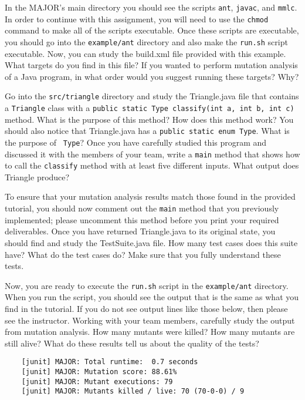 In the MAJOR's main directory you should see the scripts {\tt ant}, {\tt javac}, and {\tt mmlc}.  In order to continue
with this assignment, you will need to use the {\tt chmod} command to make all of the scripts executable.  Once these
scripts are executable, you should go into the {\tt example/ant} directory and also make the {\tt run.sh} script
executable.  Now, you can study the build.xml file provided with this example. What targets do you find in this file? If
you wanted to perform mutation analysis of a Java program, in what order would you suggest running these targets? Why?

Go into the {\tt src/triangle} directory and study the Triangle.java file that contains a {\tt Triangle} class with a
{\tt public static Type classify(int a, int b, int c)} method.  What is the purpose of this method? How does this method
work?  You should also notice that Triangle.java has a {\tt public static enum Type}.  What is the purpose of {\tt
Type}? Once you have carefully studied this program and discussed it with the members of your team, write a {\tt main}
method that shows how to call the {\tt classify} method with at least five different inputs. What output does Triangle
produce? 

To ensure that your mutation analysis results match those found in the provided tutorial, you should now comment out the
{\tt main} method that you previously implemented; please uncomment this method before you print your required
deliverables. Once you have returned Triangle.java to its original state, you should find and study the TestSuite.java
file.  How many test cases does this suite have? What do the test cases do? Make sure that you fully understand these tests.

Now, you are ready to execute the {\tt run.sh} script in the {\tt example/ant} directory.  When you run the script, you
should see the output that is the same as what you find in the tutorial.  If you do not see output lines like those
below, then please see the instructor. Working with your team members, carefully study the output from mutation
analysis.  How many mutants were killed? How many mutants are still alive? What do these results tell us about the
quality of the tests?

\begin{verbatim}
    [junit] MAJOR: Total runtime:  0.7 seconds
    [junit] MAJOR: Mutation score: 88.61%
    [junit] MAJOR: Mutant executions: 79
    [junit] MAJOR: Mutants killed / live: 70 (70-0-0) / 9
\end{verbatim}

